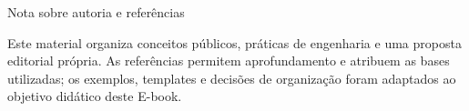 \documentclass[
  10pt,
  a4paper,
  oneside]{book}
\begin{document}
\enlargethispage{3\baselineskip}

\begin{infobox}{Nota sobre autoria e referências}

Este material organiza conceitos públicos, práticas de engenharia e uma
proposta editorial própria. As referências permitem aprofundamento e
atribuem as bases utilizadas; os exemplos, templates e decisões de
organização foram adaptados ao objetivo didático deste E-book.

\end{infobox}

\backmatter
\end{document}
